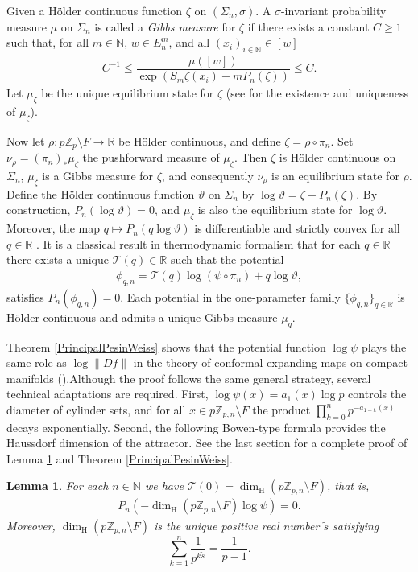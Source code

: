 \documentclass[11pt]{amsart}
\newtheorem{lemma}[theorem]{Lemma}
\theoremstyle{remark}
\numberwithin{equation}{section}
\newcommand{\N}{\mathbb{N}}
\newcommand{\R}{\mathbb{R}}
\newcommand{\Z}{\mathbb{Z}}
\newcommand{\Zp}{\mathbb{Z}_p}
\begin{document}
Given a H\"older continuous function $\zeta$ on $(\Sigma_{n},\sigma)$. A $\sigma$-invariant probability measure $\mu$ on $\Sigma_{n}$ is called a \textit{Gibbs measure} for $\zeta$ if there exists a  constant $C\geq 1$ such that, for all $m\in \N$, $w\in E_{n}^{m}$, and all $(x_{i})_{i\in \N}\in [w]$
    \begin{align*}
        C^{-1}\leq \dfrac{\mu\left([w]\right)}{\exp\left(S_{m}\zeta(x_{i})-mP_{n}(\zeta)\right)}\leq C.
    \end{align*} Let $\mu_{\zeta}$ be the unique equilibrium state for $\zeta$ (see \cite{pu} for the existence and uniqueness of $\mu_{\zeta}$). 

Now let $\rho:p\Zp \setminus F\to \mathbb{R}$ be H\"older continuous, and define $\zeta= \rho \circ \pi_{n}$. Set $\nu_{\rho}=  (\pi_{n})_{*}\mu_{\zeta}$ the pushforward measure of $\mu_{\zeta}$. Then $\zeta$ is H\"older continuous on $\Sigma_{n}$, $\mu_{\zeta}$ is a Gibbs measure for $\zeta$, and consequently $\nu_{\rho}$ is an equilibrium state for $\rho$. Define the H\"older continuous function $\vartheta$ on $\Sigma_{n}$ by $\log\vartheta=\zeta-P_{n}(\zeta)$. By construction, $P_{n}(\log\vartheta)=0$, and $\mu_{\zeta}$ is also the equilibrium state for $\log\vartheta$. Moreover, the map $q\mapsto P_{n}(q\log\vartheta)$ is differentiable and strictly convex for all $q\in \R$ \cite[Section 5.6]{pu}. It is a classical result in thermodynamic formalism that for each $q\in \R$ there exists a unique $\mathcal{T}(q)\in \R$ such that the potential
\begin{align*}
    \phi_{q,n}=\mathcal{T}(q)\log(\psi\circ\pi_{n})+q\log\vartheta ,
\end{align*} satisfies $P_{n}(\phi_{q,n})=0$. Each potential in the one-parameter family $\{\phi_{q,n}\}_{q\in \R}$ is H\"older continuous and admits a unique Gibbs measure $\mu_{q}$. 

Theorem \ref{PrincipalPesinWeiss} shows that the potential function $\log\psi$ plays the same role as $\log \|Df\|$ in the theory of conformal expanding maps on compact manifolds (\cite[Theorem 1]{yh}).Although the proof follows the same general strategy, several technical adaptations are required. First, $\log\psi(x)=a_{1}(x)\log p$ controls the diameter of cylinder sets, and for all $x\in p\Z_{p,n}\setminus F$ the product $\prod_{k=0}^{n}p^{-a_{1+k}(x)}$ decays exponentially. Second, the following Bowen-type formula provides the Haussdorf dimension of the attractor. See the last section for a complete proof of Lemma \ref{BowenFormula} and Theorem \ref{PrincipalPesinWeiss}.
\begin{lemma}\label{BowenFormula}
    For each $n\in \N$ we have $\mathcal{T}(0)=\dim_{\mathrm{H}}\left(p\Z_{p,n}\setminus F\right)$, that is,
    \begin{align*}
        P_{n}
        \left(-\dim_{\mathrm{H}}\left(p\Z_{p,n}\setminus F\right)\log \psi\right)=0.
    \end{align*} Moreover, $\dim_{\mathrm{H}}\left(p\Z_ {p,n}\setminus F\right)$ is the unique positive real number $\tilde{s}$ satisfying $$\sum^{n}_{k=1}\dfrac{1}{p^{k\tilde{s}}}=\dfrac{1}{p-1}.$$
\end{lemma}
\end{document}
